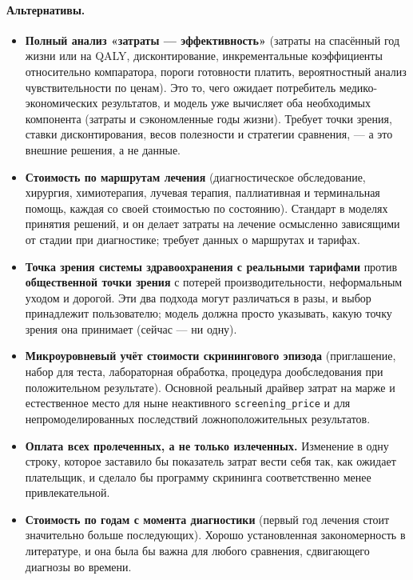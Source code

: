 \documentclass[12pt,a4paper]{article}
\newcommand{\id}[1]{\texttt{#1}}
\newcommand{\alt}[1]{\paragraph{Альтернативы.} #1}
\begin{document}
\alt{\begin{itemize}[nosep]
  \item \textbf{Полный анализ «затраты --- эффективность»} (затраты на спасённый год жизни или на QALY,
        дисконтирование, инкрементальные коэффициенты относительно компаратора, пороги готовности платить,
        вероятностный анализ чувствительности по ценам). Это то, чего ожидает потребитель
        медико-экономических результатов, и модель уже вычисляет оба необходимых компонента (затраты и
        сэкономленные годы жизни). Требует точки зрения, ставки дисконтирования, весов полезности и
        стратегии сравнения, --- а это внешние решения, а не данные.
  \item \textbf{Стоимость по маршрутам лечения} (диагностическое обследование, хирургия, химиотерапия,
        лучевая терапия, паллиативная и терминальная помощь, каждая со своей стоимостью по состоянию).
        Стандарт в моделях принятия решений, и он делает затраты на лечение осмысленно зависящими от стадии
        при диагностике; требует данных о маршрутах и тарифах.
  \item \textbf{Точка зрения системы здравоохранения с реальными тарифами} против \textbf{общественной точки
        зрения} с потерей производительности, неформальным уходом и дорогой. Эти два подхода могут
        различаться в разы, и выбор принадлежит пользователю; модель должна просто указывать, какую точку
        зрения она принимает (сейчас --- ни одну).
  \item \textbf{Микроуровневый учёт стоимости скринингового эпизода} (приглашение, набор для теста,
        лабораторная обработка, процедура дообследования при положительном результате). Основной
        реальный драйвер затрат на марже и естественное место для ныне неактивного \id{screening\_price} и
        для непромоделированных последствий ложноположительных результатов.
  \item \textbf{Оплата всех пролеченных, а не только излеченных.} Изменение в одну строку, которое заставило
        бы показатель затрат вести себя так, как ожидает плательщик, и сделало бы программу скрининга
        соответственно менее привлекательной.
  \item \textbf{Стоимость по годам с момента диагностики} (первый год лечения стоит значительно больше
        последующих). Хорошо установленная закономерность в литературе, и она была бы важна для любого
        сравнения, сдвигающего диагнозы во времени.
\end{itemize}}
\end{document}
